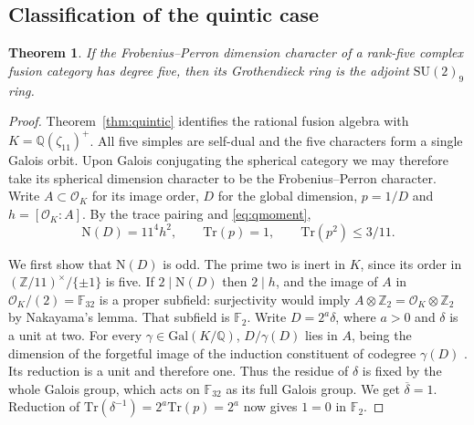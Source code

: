 \documentclass[11pt,a4paper]{article}
\newtheorem{theorem}{Theorem}[section]
\numberwithin{equation}{section}
\begin{document}
\subsection{Classification of the quintic case}
\begin{theorem}\label{thm:quintic-classification}
If the Frobenius--Perron dimension character of a rank-five complex fusion category has degree five, then its Grothendieck ring is the adjoint $\mathrm{SU}(2)_9$ ring.
\end{theorem}
\begin{proof}
Theorem~\ref{thm:quintic} identifies the rational fusion algebra with $K=\mathbb Q(\zeta_{11})^+$. All five simples are self-dual and the five characters form a single Galois orbit. Upon Galois conjugating the spherical category we may therefore take its spherical dimension character to be the Frobenius--Perron character. Write $A\subset\mathcal O_K$ for its image order, $D$ for the global dimension, $p=1/D$ and $h=[\mathcal O_K:A]$. By the trace pairing and \eqref{eq:qmoment},
\[
 \mathrm N(D)=11^4h^2,\qquad \mathrm{Tr}(p)=1,\qquad
 \mathrm{Tr}(p^2)\le 3/11.
\]

We first show that $\mathrm N(D)$ is odd. The prime two is inert in $K$, since its order in $(\mathbb Z/11)^\times/\{\pm1\}$ is five. If $2\mid\mathrm N(D)$ then $2\mid h$, and the image of $A$ in $\mathcal O_K/(2)=\mathbb F_{32}$ is a proper subfield: surjectivity would imply $A\otimes\mathbb Z_2=\mathcal O_K\otimes\mathbb Z_2$ by Nakayama's lemma. That subfield is $\mathbb F_2$. Write $D=2^a\delta$, where $a>0$ and $\delta$ is a unit at two. For every $\gamma\in\mathrm{Gal}(K/\mathbb Q)$, $D/\gamma(D)$ lies in $A$, being the dimension of the forgetful image of the induction constituent of codegree $\gamma(D)$ \cite[Theorem~2.13]{Ostrik3}. Its reduction is a unit and therefore one. Thus the residue of $\delta$ is fixed by the whole Galois group, which acts on $\mathbb F_{32}$ as its full Galois group. We get $\overline\delta=1$. Reduction of $\mathrm{Tr}(\delta^{-1})=2^a\mathrm{Tr}(p)=2^a$ now gives $1=0$ in $\mathbb F_2$.


\end{proof}
\end{document}
